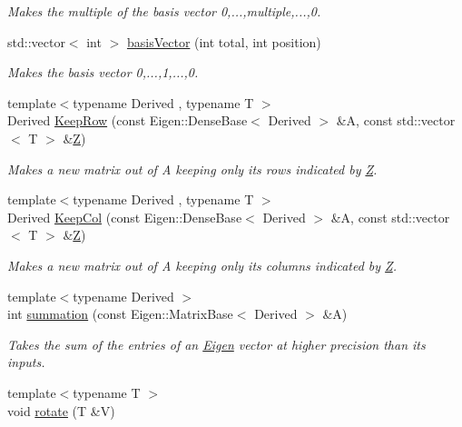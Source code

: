 \begin{DoxyCompactItemize}
\begin{DoxyCompactList}\small\item\em Makes the multiple of the basis vector 0,...,multiple,...,0. \end{DoxyCompactList}\item 
std\+::vector$<$ int $>$ \hyperlink{namespaceMackey_ae3454eb9b2574a835a29e3f58cfc6ead}{basis\+Vector} (int total, int position)
\begin{DoxyCompactList}\small\item\em Makes the basis vector 0,...,1,...,0. \end{DoxyCompactList}\item 
{\footnotesize template$<$typename Derived , typename T $>$ }\\Derived \hyperlink{namespaceMackey_ae44b27dcf905a7ff976ebc79f197c579}{Keep\+Row} (const Eigen\+::\+Dense\+Base$<$ Derived $>$ \&A, const std\+::vector$<$ T $>$ \&\hyperlink{classZ}{Z})
\begin{DoxyCompactList}\small\item\em Makes a new matrix out of A keeping only its rows indicated by \hyperlink{classZ}{Z}. \end{DoxyCompactList}\item 
{\footnotesize template$<$typename Derived , typename T $>$ }\\Derived \hyperlink{namespaceMackey_a782d9ce52543c3ae3520b4859dda3240}{Keep\+Col} (const Eigen\+::\+Dense\+Base$<$ Derived $>$ \&A, const std\+::vector$<$ T $>$ \&\hyperlink{classZ}{Z})
\begin{DoxyCompactList}\small\item\em Makes a new matrix out of A keeping only its columns indicated by \hyperlink{classZ}{Z}. \end{DoxyCompactList}\item 
{\footnotesize template$<$typename Derived $>$ }\\int \hyperlink{namespaceMackey_a359aa27a035d2b1f1a3f2f8270fc9e52}{summation} (const Eigen\+::\+Matrix\+Base$<$ Derived $>$ \&A)
\begin{DoxyCompactList}\small\item\em Takes the sum of the entries of an \hyperlink{namespaceEigen}{Eigen} vector at higher precision than its inputs. \end{DoxyCompactList}\item 
{\footnotesize template$<$typename T $>$ }\\void \hyperlink{namespaceMackey_a38a833de54971845cbdb8c96f830725b}{rotate} (T \&V)

\end{DoxyCompactItemize}
